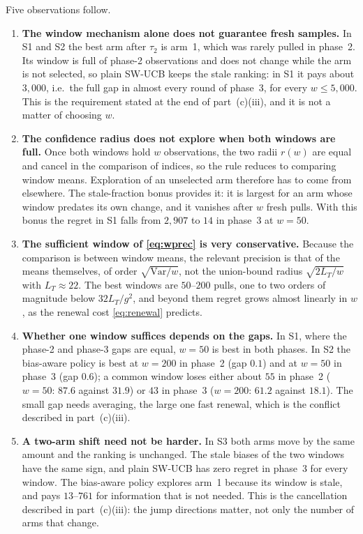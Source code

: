 Five observations follow.

\begin{enumerate}
\item \textbf{The window mechanism alone does not guarantee fresh samples.} In S1 and S2 the best arm after $\tau_2$ is arm~1, which was rarely pulled in phase~2. Its window is full of phase-2 observations and does not change while the arm is not selected, so plain SW-UCB keeps the stale ranking: in S1 it pays about $3{,}000$, i.e.\ the full gap in almost every round of phase~3, for every $w\le5{,}000$. This is the requirement stated at the end of part~(c)(iii), and it is not a matter of choosing $w$.
\item \textbf{The confidence radius does not explore when both windows are full.} Once both windows hold $w$ observations, the two radii $r(w)$ are equal and cancel in the comparison of indices, so the rule reduces to comparing window means. Exploration of an unselected arm therefore has to come from elsewhere. The stale-fraction bonus provides it: it is largest for an arm whose window predates its own change, and it vanishes after $w$ fresh pulls. With this bonus the regret in S1 falls from $2{,}907$ to $14$ in phase~3 at $w=50$.
\item \textbf{The sufficient window of \eqref{eq:wprec} is very conservative.} Because the comparison is between window means, the relevant precision is that of the means themselves, of order $\sqrt{\mathrm{Var}/w}$, not the union-bound radius $\sqrt{2L_T/w}$ with $L_T\approx22$. The best windows are $50$--$200$ pulls, one to two orders of magnitude below $32L_T/g^2$, and beyond them regret grows almost linearly in $w$, as the renewal cost \eqref{eq:renewal} predicts.
\item \textbf{Whether one window suffices depends on the gaps.} In S1, where the phase-2 and phase-3 gaps are equal, $w=50$ is best in both phases. In S2 the bias-aware policy is best at $w=200$ in phase~2 (gap $0.1$) and at $w=50$ in phase~3 (gap $0.6$); a common window loses either about $55$ in phase~2 ($w=50$: $87.6$ against $31.9$) or $43$ in phase~3 ($w=200$: $61.2$ against $18.1$). The small gap needs averaging, the large one fast renewal, which is the conflict described in part~(c)(iii).
\item \textbf{A two-arm shift need not be harder.} In S3 both arms move by the same amount and the ranking is unchanged. The stale biases of the two windows have the same sign, and plain SW-UCB has zero regret in phase~3 for every window. The bias-aware policy explores arm~1 because its window is stale, and pays $13$--$761$ for information that is not needed. This is the cancellation described in part~(c)(iii): the jump directions matter, not only the number of arms that change.
\end{enumerate}

